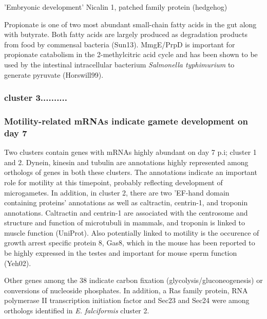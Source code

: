 \documentclass{bmcart}
\begin{document}
'Embryonic development'
Nicalin 1, patched family protein (hedgehog)  

Propionate is one of two most abundant small-chain fatty acids 
in the gut along with butyrate. Both fatty acids are largely produced as degradation products from food
by commensal bacteria (Sun13). MmgE/PrpD is important for propionate catabolism in the 
2-methylcitric acid cycle and has been shown to be used by the intestinal intracellular bacterium 
\textit{Salmonella typhimurium} to generate pyruvate (Horswill99). 

\subsubsection*{cluster 3..........}




\subsubsection*{Motility-related mRNAs indicate gamete development on day 7}
Two clusters contain genes with mRNAs highly abundant on day 7 p.i; cluster 1 and 2.
Dynein, kinesin and tubulin are annotations highly represented among orthologs of genes 
in both these clusters. The annotations indicate an important role for motility at this
timepoint, probably reflecting development of microgametes.
In addition, in cluster 2, there are two 'EF-hand domain containing proteins' annotations as well 
as caltractin, centrin-1, and troponin annotations. Caltractin and 
centrin-1 are associated with the centrosome and structure and function of microtubuli in mammals, 
and troponin is linked to muscle function (UniProt). 
Also potentially linked to motility is the occurence of growth arrest specific protein 8,
Gas8, which in the mouse has been reported to be highly 
expressed in the testes and important for mouse sperm function (Yeh02). 

Other genes among the 38 indicate carbon fixation (glycolysis/gluconeogenesis) or 
conversions of nucleoside phosphates. In addition, a Ras family protein, RNA 
polymerase II transcription initiation factor and Sec23 and Sec24 were among orthologs 
identified in \textit{E. falciformis} cluster 2.
\end{document}
